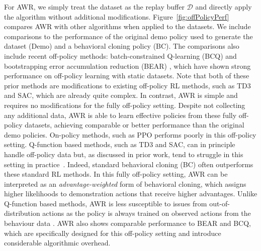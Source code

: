 For AWR, we simply treat the dataset as the replay buffer $\mathcal{D}$ and directly apply the algorithm without additional modifications. Figure~\ref{fig:offPolicyPerf} compares AWR with other algorithms when applied to the datasets. We include comparisons to the performance of the original demo policy used to generate the dataset (Demo) and a behavioral cloning policy (BC). The comparisons also include recent off-policy methods: batch-constrained Q-learning (BCQ) \citep{fujimoto19offpolicy} and bootstrapping error accumulation reduction (BEAR) \citep{BEAR2019}, which have shown strong performance on off-policy learning with static datasets. Note that both of these prior methods are modifications to existing off-policy RL methods, such as TD3 and SAC, which are already quite complex. In contrast, AWR is simple and requires no modifications for the fully off-policy setting. Despite not collecting any additional data, AWR is able to learn effective policies from these fully off-policy datasets, achieving comparable or better performance than the original demo policies. On-policy methods, such as PPO performs poorly in this off-policy setting. Q-function based methods, such as TD3 and SAC, can in principle handle off-policy data but, as discussed in prior work, tend to struggle in this setting in practice~\citep{fujimoto19offpolicy,BEAR2019}. Indeed, standard behavioral cloning (BC) often outperforms these standard RL methods. In this fully off-policy setting, AWR can be interpreted as an \emph{advantage-weighted} form of behavioral cloning, which assigns higher likelihoods to demonstration actions that receive higher advantages. Unlike Q-function based methods, AWR is less susceptible to issues from out-of-distribution actions as the policy is always trained on observed actions from the behaviour data \citep{BEAR2019}. AWR also shows comparable performance to BEAR and BCQ, which are specifically designed for this off-policy setting and introduce considerable algorithmic overhead.

